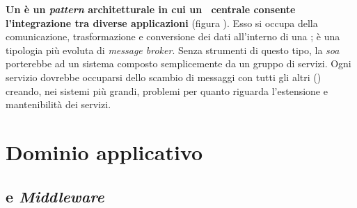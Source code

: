 \textbf{Un  è un \textit{pattern} architetturale in cui un \software\ centrale consente l'integrazione tra diverse applicazioni} (figura \thefigure).
Esso si occupa della comunicazione, trasformazione e conversione dei dati all'interno di una ; è una tipologia più evoluta di \textit{message broker}.
Senza strumenti di questo tipo, la \textit{\acrlong{soa}} porterebbe ad un sistema composto semplicemente da un gruppo di servizi.
Ogni servizio dovrebbe occuparsi dello scambio di messaggi con tutti gli altri () creando, nei sistemi più grandi, problemi per quanto riguarda l'estensione e mantenibilità dei servizi.




\section{Dominio applicativo}

\subsection{ e \textit{Middleware}}

